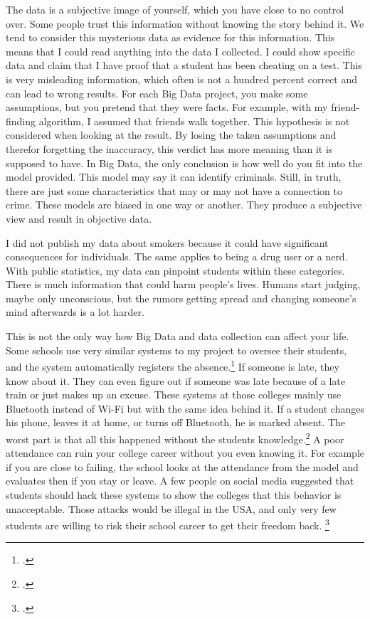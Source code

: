 \documentclass[paper=a4, fontsize=11pt]{article}
\begin{document}
The data is a subjective image of yourself, which you have close to no control over. Some people trust this information without knowing the story behind it. We tend to consider this mysterious data as evidence for this information. This means that I could read anything into the data I collected. I could show specific data and claim that I have proof that a student has been cheating on a test. This is very misleading information, which often is not a hundred percent correct and can lead to wrong results. For each Big Data project, you make some assumptions, but you pretend that they were facts. For example, with my friend-finding algorithm, I assumed that friends walk together. This hypothesis is not considered when looking at the result. By losing the taken assumptions and therefor forgetting the inaccuracy, this verdict has more meaning than it is supposed to have. In Big Data, the only conclusion is how well do you fit into the model provided. This model may say it can identify criminals. Still, in truth, there are just some characteristics that may or may not have a connection to crime. These models are biased in one way or another. They produce a subjective view and result in objective data.

I did not publish my data about smokers because it could have significant consequences for individuals. The same applies to being a drug user or a nerd. With public statistics, my data can pinpoint students within these categories. There is much information that could harm people's lives. Humans start judging, maybe only unconscious, but the rumors getting spread and changing someone's mind afterwards is a lot harder.

This is not the only way how Big Data and data collection can affect your life. Some schools use very similar systems to my project to oversee their students, and the system automatically registers the absence.\footcite{collegestracking}
 If someone is late, they know about it. They can even figure out if someone was late because of a late train or just makes up an excuse. These systems at those colleges mainly use Bluetooth instead of Wi-Fi but with the same idea behind it. If a student changes his phone, leaves it at home, or turns off Bluetooth, he is marked absent. The worst part is that all this happened without the students knowledge.\footcite{collegestracking} A poor attendance can ruin your college career without you even knowing it. For example if you are close to failing, the school looks at the attendance from the model and evaluates then if you stay or leave. A few people on social media suggested that students should hack these systems to show the colleges that this behavior is unacceptable. Those attacks would be illegal in the USA, and only very few students are willing to risk their school career to get their freedom back. \footcite{studentrespondonsurveillance}
\end{document}
